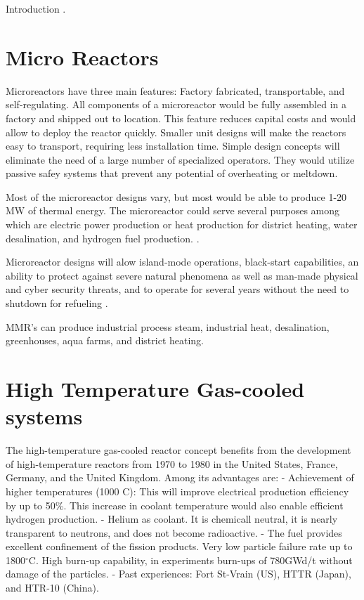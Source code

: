 Introduction \cite{huff_extensions_2014}.

\section{Micro Reactors}

Microreactors have three main features: Factory fabricated, transportable, and self-regulating. All components of a microreactor would be fully assembled in a factory and shipped out to location. This feature reduces capital costs and would allow to deploy the reactor quickly. Smaller unit designs will make the reactors easy to transport, requiring less installation time. Simple design concepts will eliminate the need of a large number of specialized operators. They would utilize passive safey systems that prevent any potential of overheating or meltdown.

Most of the microreactor designs vary, but most would be able to produce 1-20 MW of thermal energy. The microreactor could serve several purposes among which are electric power production or heat production for district heating, water desalination, and hydrogen fuel production.
\cite{noauthor_ultimate_2019}.

Microreactor designs will alow island-mode operations, black-start capabilities, an ability to protect against severe natural phenomena as well as man-made physical and cyber security threats, and to operate for several years without the need to shutdown for refueling \cite{nichol_roadmap_2018}.

MMR's can produce industrial process steam, industrial heat, desalination, greenhouses, aqua farms, and district heating.

\section{High Temperature Gas-cooled systems}

The high-temperature gas-cooled reactor concept benefits from the development of high-temperature reactors from 1970 to 1980 in the United States, France, Germany, and the United Kingdom. 
Among its advantages are:
- Achievement of higher temperatures (1000 C): This will improve electrical production efficiency by up to 50\%. This increase in coolant temperature would also enable efficient hydrogen production.
- Helium as coolant. It is chemicall neutral, it is nearly transparent to neutrons, and does not become radioactive.
- The fuel provides excellent confinement of the fission products. Very low particle failure rate up to 1800$^{\circ}$C. High burn-up capability, in experiments burn-ups of 780GWd/t without damage of the particles.
- Past experiences: Fort St-Vrain (US), HTTR (Japan), and HTR-10 (China).
\cite{france_gas-cooled_2006}

